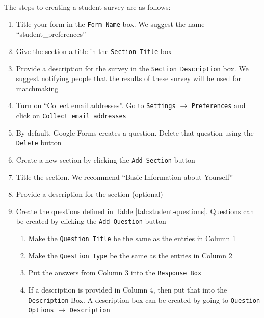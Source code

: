 The steps to creating a student survey are as follows:
\begin{enumerate}

	\item Title your form in the \texttt{Form Name} box. We suggest the name ``student\_preferences''
	\item Give the section a title in the \texttt{Section Title} box
	\item Provide a description for the survey in the \texttt{Section Description} box.
			We suggest notifying people that the results of these survey will be used for matchmaking
	\item Turn on ``Collect email addresses''.  Go to \texttt{Settings} $\rightarrow$ \texttt{Preferences} and click on \texttt{Collect email addresses}
	\item By default, Google Forms creates a question.  Delete that question using the \texttt{Delete} button
	
	\item Create a new section by clicking the \texttt{Add Section} button
	\item Title the section.  We recommend ``Basic Information about Yourself''
	\item Provide a description for the section (optional)
	\item Create the questions defined in Table \ref{tab:student-questions}.  Questions can be created by clicking the \texttt{Add Question} button
		\begin{enumerate}
			\item Make the \texttt{Question Title} be the same as the entries in Column 1
			\item Make the \texttt{Question Type} be the same as the entries in Column 2
			\item Put the answers from Column 3 into the \texttt{Response Box}
			\item If a description is provided in Column 4, then put that into the \texttt{Description} Box. A description box can be created by going to \texttt{Question Options} $\rightarrow$ \texttt{Description}			
		\end{enumerate}
		
	\begin{table}[h!]
		\centering
		\begin{tabular}{| l | l | l | p{2in} |}
		

\end{tabular}
\end{table}
\end{enumerate}
